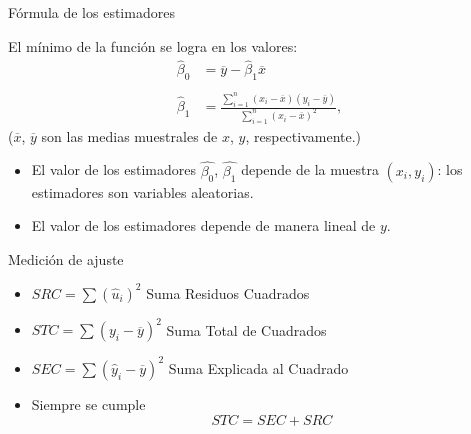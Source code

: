 \documentclass[11pt,handout]{beamer}
\begin{document}
\begin{frame}
{Fórmula de los estimadores}


El mínimo de la función se logra en los valores:
\begin{align*}
	\widehat{\beta}_0 & = \overline{y} - \widehat{\beta}_1 \overline{x} \\
	& \\
	\widehat{\beta}_1 & = \frac{\sum_{i=1}^n (x_i-\overline{x}) (y_i-\overline{y}) }{\sum_{i=1}^n (x_i-\overline{x})^2} ,
\end{align*}
($\overline{x}$, $\overline{y}$ son las medias muestrales de $x$, $y$, respectivamente.)  

\begin{itemize}
	\item El valor de los estimadores $\widehat{\beta_0}$, $\widehat{\beta_1}$ depende de la muestra $(x_i, y_i)$: los estimadores son variables aleatorias.
	
	\item El valor de los estimadores depende de manera lineal de $y$.
\end{itemize}

\end{frame}



\begin{frame}
{Medición de ajuste}

\begin{itemize}
	\item $\displaystyle{ SRC = \sum (\widehat{u}_i)^2}$ \qquad \alert{Suma Residuos Cuadrados}
	\item $\displaystyle{ STC = \sum (y_i - \overline{y})^2}$ \qquad \alert{Suma Total de Cuadrados}
	\item $\displaystyle{ SEC = \sum (\widehat{y}_i - \overline{y})^2}$ \qquad \alert{Suma Explicada al Cuadrado}
	\item Siempre se cumple
		\[
			STC = SEC + SRC
		\]
\end{itemize}

\end{frame}
\end{document}
